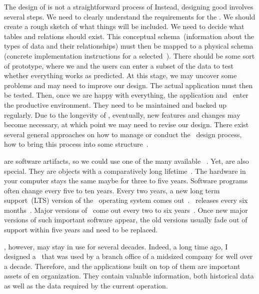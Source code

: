 %
The design of  is not a straightforward process of 
Instead, designing good  involves several steps.
We need to clearly understand the requirements for the \db.
We should create a rough sketch of what things will be included.
We need to decide what tables and relations should exist.
This conceptual schema~(information about the types of data and their relationships) must then be mapped to a physical schema (concrete implementation instructions for a selected~\dbms).
There should be some sort of prototype, where we and the users can enter a subset of the data to test whether everything works as predicted.
At this stage, we may uncover some problems and may need to improve our design.
The actual application must then be tested.
Then, once we are happy with everything, the application and \db\ enter the productive environment.
They need to be maintained and backed up regularly.
Due to the longevity of , eventually, new features and changes may become necessary, at which point we may need to revise our design.
There exist several general approaches on how to manage or conduct the \db\ design process, how to bring this process into some structure~\cite{GMTM2011DDLC}.

 are software artifacts, so we could use one of the many available ~\cite{I2018SAH,N2024SEFDS}.
Yet,  are also special.
They are objects with a comparatively long lifetime~\cite{SS2005EIDDDFDB:I}.
The hardware in your computer stays the same maybe for three to five years.
Software programs often change every five to ten years.
Every two years, a new long term support~(LTS) version of the \ubuntu\ operating system comes out~\cite{C2024TULARC}.
\libreoffice\ releases every six months~\cite{DF2024TDFWR}.
Major versions of \microsoftWindows\ come out every two to six years~\cite{GLRGRLJH2025LOWV}.
Once new major versions of such important software appear, the old versions usually fade out of support within five years and need to be replaced.

, however, may stay in use for several decades.
Indeed, a long time ago, I designed a \db\ that was used by a branch office of a midsized company for well over a decade.
Therefore,  and the applications built on top of them are important assets of en organization.
They contain valuable information, both historical data as well as the data required by the current operation.

